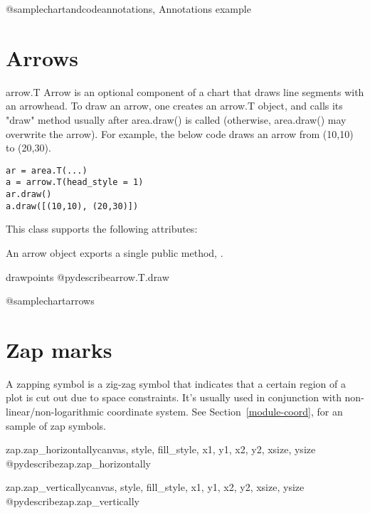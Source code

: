 \documentclass{howto}
\newcommand{\xref}[1]{See Section~\ref{#1}}
\begin{document}
@samplechartandcode{annotations, Annotations example}

\section{Arrows}

\begin{classdesc*}{arrow.T}
Arrow is an optional component of a chart that draws line segments with
an arrowhead. To draw an arrow, one creates an arrow.T object, and calls
its "draw" method usually after area.draw() is called (otherwise, area.draw()
may overwrite the arrow). For example, the below code draws an arrow
from (10,10) to (20,30).

\begin{verbatim}
ar = area.T(...)
a = arrow.T(head_style = 1)
ar.draw()
a.draw([(10,10), (20,30)])
\end{verbatim}
\end{classdesc*}

This class supports the following attributes:


An arrow object exports a single public method, .

\begin{methoddesc}{draw}{points}
@pydescribe{arrow.T.draw}
\end{methoddesc}

@samplechart{arrows}

\section{Zap marks}

A zapping symbol is a zig-zag symbol that indicates that a certain
region of a plot is cut out due to space constraints. It's usually used
in conjunction with non-linear/non-logarithmic coordinate system.
\xref{module-coord}, for an sample of zap symbols.

\begin{funcdesc}{zap.zap_horizontally}{canvas, style, fill_style, x1, y1, x2, y2, xsize, ysize}
@pydescribe{zap.zap_horizontally}
\end{funcdesc}

\begin{funcdesc}{zap.zap_vertically}{canvas, style, fill_style, x1, y1, x2, y2, xsize, ysize}
@pydescribe{zap.zap_vertically}
\end{funcdesc}
\end{document}
